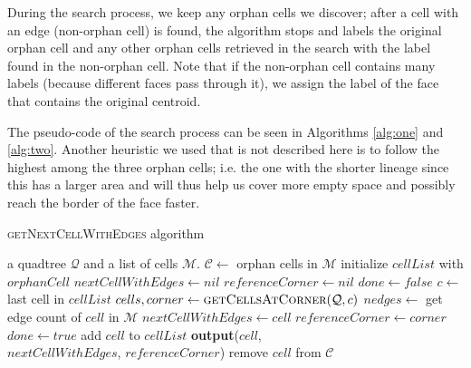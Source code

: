 During the search process, we keep any orphan cells we discover; after a cell with an edge (non-orphan cell) is found, the algorithm stops and labels the original orphan cell and any other orphan cells retrieved in the search with the label found in the non-orphan cell. Note that if the non-orphan cell contains many labels (because different faces pass through it), we assign the label of the face that contains the original centroid.

The pseudo-code of the search process can be seen in Algorithms \ref{alg:one} and \ref{alg:two}. Another heuristic we used that is not described here is to follow the highest among the three orphan cells; i.e. the one with the shorter lineage since this has a larger area and will thus help us cover more empty space and possibly reach the border of the face faster.

{\ssp
\begin{algorithm}\caption{\textsc{getNextCellWithEdges} algorithm}\label{alg:one}
    \begin{algorithmic}[1]
    \Require a quadtree $\mathcal Q$ and a list of cells $\mathcal M$.
        \State $\mathcal C \gets $ orphan cells in $\mathcal M$
            \State initialize $cellList$ with $orphanCell$ 
            \State $nextCellWithEdges \gets nil$
            \State $referenceCorner \gets nil$
            \State $done \gets false$
                \State $c \gets $ last cell in $cellList$ 
                \State $cells, corner \gets \textsc{getCellsAtCorner}(\mathcal Q, c)$ 
                    \State $nedges \gets$ get edge count of $cell$ in $\mathcal M$ 
                        \State $nextCellWithEdges \gets cell$
                        \State $referenceCorner \gets corner$
                        \State $done \gets true$
                    \Else
                            \State add $cell$ to $cellList$
                        \EndIf
                    \EndIf
                \EndFor
            \EndWhile
                \State \textbf{output}($cell$, \\
                \hspace{2.5cm} $nextCellWithEdges$, $referenceCorner$)
                \State remove $cell$ from $\mathcal C$
            \EndFor
        \EndFor
    \EndFunction
    \end{algorithmic}
\end{algorithm}
}

